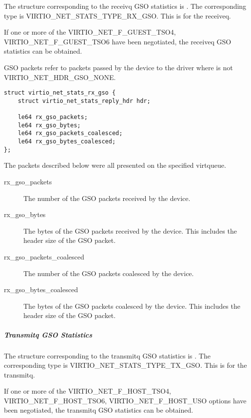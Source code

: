 The structure corresponding to the receivq GSO statistics is
. The corresponding type is
VIRTIO_NET_STATS_TYPE_RX_GSO. This is for the receiveq.

If one or more of the VIRTIO_NET_F_GUEST_TSO4, VIRTIO_NET_F_GUEST_TSO6
have been negotiated, the receiveq GSO statistics can be obtained.

GSO packets refer to packets passed by the device to the driver where
 is not VIRTIO_NET_HDR_GSO_NONE.

\begin{lstlisting}
struct virtio_net_stats_rx_gso {
    struct virtio_net_stats_reply_hdr hdr;

    le64 rx_gso_packets;
    le64 rx_gso_bytes;
    le64 rx_gso_packets_coalesced;
    le64 rx_gso_bytes_coalesced;
};
\end{lstlisting}

The packets described below were all presented on the specified virtqueue.
\begin{description}
    \item [rx_gso_packets]
        The number of the GSO packets received by the device.

    \item [rx_gso_bytes]
        The bytes of the GSO packets received by the device.
        This includes the header size of the GSO packet.

    \item [rx_gso_packets_coalesced]
        The number of the GSO packets coalesced by the device.

    \item [rx_gso_bytes_coalesced]
        The bytes of the GSO packets coalesced by the device.
        This includes the header size of the GSO packet.
\end{description}

\subparagraph{Transmitq GSO Statistics}\label{sec:Device Types / Network Device / Device Operation / Control Virtqueue / Device Statistics / Transmitq GSO Statistics}

The structure corresponding to the transmitq GSO statistics is
. The corresponding type is
VIRTIO_NET_STATS_TYPE_TX_GSO. This is for the transmitq.

If one or more of the VIRTIO_NET_F_HOST_TSO4, VIRTIO_NET_F_HOST_TSO6,
VIRTIO_NET_F_HOST_USO options have been negotiated, the transmitq GSO statistics
can be obtained.

